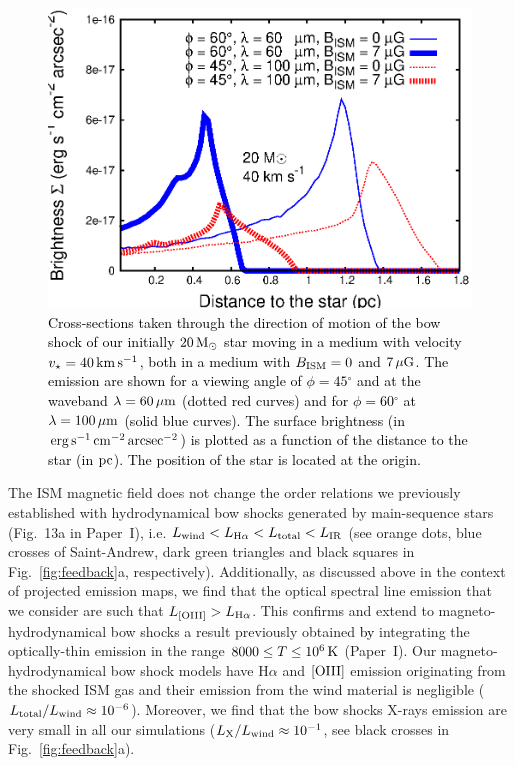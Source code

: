 \documentclass[useAMS,usenatbib]{mn2e}
\newcommand{\degree}{\ensuremath{^\circ}}
\begin{document}
\begin{figure}
	\begin{minipage}[b]{ 0.48\textwidth}
		\includegraphics[width=1.0\textwidth]{./plot_comparison.eps}
	\end{minipage}  	
	\caption{
		\textcolor{black}{
		Cross-sections taken through the direction of motion of the bow shock 
of our initially $20\, \rm M_{\odot}$ star moving in a medium 
with velocity $v_{\star}=40\, \rm km\, \rm s^{-1}$, both in a medium with 
$B_{\rm ISM}=0$ and $7\, \mu\rm G$. The emission are shown for a viewing angle 
of $\phi=45\degree$ and at the waveband $\lambda=60\, \mu\rm m$ (dotted red curves)
and for $\phi=60\degree$ at $\lambda=100\, \mu\rm m$ (solid blue curves).  
The surface brightness (in $\rm erg\, \rm s^{-1}\, \rm cm^{-2}\, \rm arcsec^{-2}$) 
is plotted as a function of the distance to the star (in $\rm pc$). 
The position of the star is located at the origin.} 
		 }
	\label{fig:cuts_mhd}  
\end{figure}


The ISM magnetic field does not change the order relations we previously
established with hydrodynamical bow shocks generated by main-sequence stars 
(Fig.~13a in Paper~I), i.e. $L_{\rm wind} < L_{\rm H\alpha} < L_{\rm total} <
L_{\rm IR}$ (see orange dots, blue crosses of Saint-Andrew, dark green triangles
and black squares in Fig.~\ref{fig:feedback}a, respectively). Additionally, as
discussed above in the context of projected emission maps, we find that the 
optical spectral line emission that we consider are such that $L_{[\rm O{\sc III}]}
> L_{\rm H\alpha}$. This confirms and extend to magneto-hydrodynamical bow shocks 
a result previously obtained \textcolor{black}{by} integrating the optically-thin emission in the range
$8000 \le T \leq 10^{6}\, \rm K$ (Paper~I). Our magneto-hydrodynamical bow shock
models have H$\alpha$ and $[\rm O{\sc III}]$ emission originating from the shocked 
ISM gas and their emission from the wind material is negligible ($L_{\rm total}/L_{\rm
wind}\approx10^{-6}$). Moreover, we find that the bow shocks X-rays emission are
very small in all our simulations ($L_{\rm X}/L_{\rm wind}\approx10^{-1}$, see
black crosses in Fig.~\ref{fig:feedback}a). 
\end{document}
